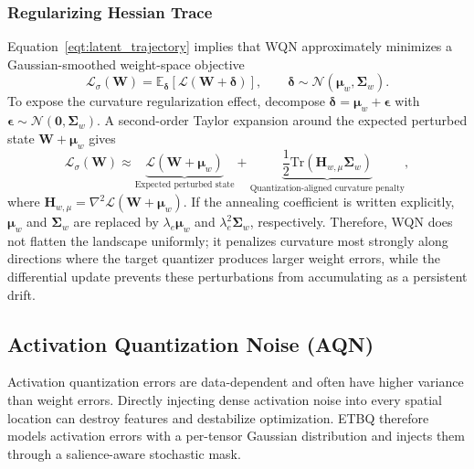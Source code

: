 \documentclass{article}
\begin{document}
\subsubsection{Regularizing Hessian Trace}
\label{sec:wqn_hessian}

Equation~\eqref{eqt:latent_trajectory} implies that WQN approximately minimizes a Gaussian-smoothed weight-space objective
\[
\mathcal{L}_{\sigma}(\boldsymbol{W}) = \mathbb{E}_{\boldsymbol{\delta}}[\mathcal{L}(\boldsymbol{W} + \boldsymbol{\delta})],
\qquad
\boldsymbol{\delta}\sim\mathcal{N}(\boldsymbol{\mu}_w,\boldsymbol{\Sigma}_w).
\]
To expose the curvature regularization effect, decompose $\boldsymbol{\delta}=\boldsymbol{\mu}_w+\boldsymbol{\epsilon}$ with $\boldsymbol{\epsilon}\sim\mathcal{N}(\mathbf{0},\boldsymbol{\Sigma}_w)$. A second-order Taylor expansion around the expected perturbed state $\boldsymbol{W}+\boldsymbol{\mu}_w$ gives
\begin{equation}
\label{eqt:effective_loss_final}
\mathcal{L}_{\sigma}(\boldsymbol{W}) \approx \underbrace{\mathcal{L}(\boldsymbol{W}+\boldsymbol{\mu}_w)}_{\text{Expected perturbed state}} + \underbrace{\frac{1}{2}\mathrm{Tr}(\boldsymbol{H}_{w,\mu}\boldsymbol{\Sigma}_w)}_{\text{Quantization-aligned curvature penalty}},
\end{equation}
where $\boldsymbol{H}_{w,\mu}=\nabla^2\mathcal{L}(\boldsymbol{W}+\boldsymbol{\mu}_w)$. If the annealing coefficient is written explicitly, $\boldsymbol{\mu}_w$ and $\boldsymbol{\Sigma}_w$ are replaced by $\lambda_e\boldsymbol{\mu}_w$ and $\lambda_e^2\boldsymbol{\Sigma}_w$, respectively. Therefore, WQN does not flatten the landscape uniformly; it penalizes curvature most strongly along directions where the target quantizer produces larger weight errors, while the differential update prevents these perturbations from accumulating as a persistent drift.

\subsection{Activation Quantization Noise (AQN)}
\label{sec:aqn}

Activation quantization errors are data-dependent and often have higher variance than weight errors. Directly injecting dense activation noise into every spatial location can destroy features and destabilize optimization. ETBQ therefore models activation errors with a per-tensor Gaussian distribution and injects them through a salience-aware stochastic mask.
\end{document}
